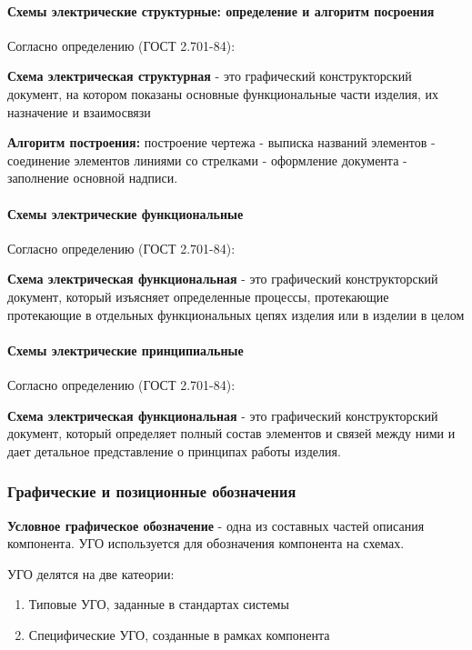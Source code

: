 \documentclass{article}
\begin{document}
\begin{flushleft}
\paragraph{Схемы электрические структурные: определение и алгоритм посроения}

Согласно определению (ГОСТ 2.701-84):

\textbf{Схема электрическая структурная} - это графический конструкторский документ, на котором показаны основные функциональные части изделия, их назначение и взаимосвязи

\textbf{Алгоритм построения:} построение чертежа - выписка названий элементов - соединение элементов линиями со стрелками - оформление документа - заполнение основной надписи.

\paragraph{Схемы электрические функциональные}

Согласно определению (ГОСТ 2.701-84):

\textbf{Схема электрическая функциональная} - это графический конструкторский документ, который изъясняет определенные процессы, протекающие протекающие в отдельных функциональных цепях изделия или в изделии в целом

\paragraph{Схемы электрические принципиальные}

Согласно определению (ГОСТ 2.701-84):

\textbf{Схема электрическая функциональная} - это графический конструкторский документ, который определяет полный состав элементов и связей между ними и дает детальное представление о принципах работы изделия.

\subsubsection{Графические и позиционные обозначения}

\textbf{Условное графическое обозначение} - одна из составных частей описания компонента. УГО используется для обозначения компонента на схемах.

УГО делятся на две катеории:

\begin{enumerate}
    \item Типовые УГО, заданные в стандартах системы
    \item Специфические УГО, созданные в рамках компонента
\end{enumerate}


\end{flushleft}
\end{document}
